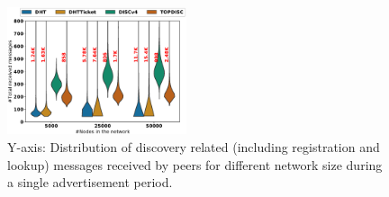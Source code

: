 %
%

%

\begin{figure}[!h]
\centering
\includegraphics[width=0.470\textwidth]{results/no_split/violin_size_totalMsg.eps}
\caption{Y-axis: Distribution of discovery related (including registration and lookup) messages received by peers for different network size during a single advertisement period.}
\label{fig:msgsPerSize}
\end{figure}

